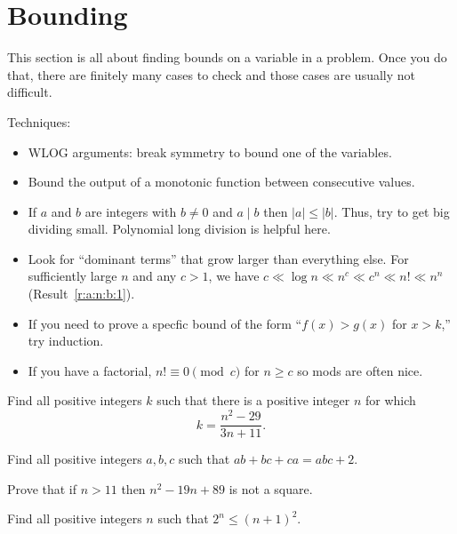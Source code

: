 \section{Bounding}
This section is all about finding bounds on a variable in a problem. Once you do
that, there are finitely many cases to check and those cases are usually not
difficult.

Techniques:
\begin{itemize}
  \item WLOG arguments: break symmetry to bound one of the variables.
  \item Bound the output of a monotonic function between consecutive values.
  \item If $a$ and $b$ are integers with $b\ne 0$ and $a\mid b$ then
    $|a|\le|b|$. Thus, try to get big dividing small. Polynomial long division
    is helpful here.
  \item Look for ``dominant terms'' that grow larger than everything else. For
    sufficiently large $n$ and any $c>1$, we have $c\ll\log n\ll n^c\ll c^n\ll
    n!\ll n^n$ (Result~\ref{r:a:n:b:1}).
  \item If you need to prove a specfic bound of the form ``$f(x)>g(x)$ for
    $x>k$,'' try induction.
  \item If you have a factorial, $n!\equiv 0\pmod c$ for $n\ge c$ so mods are
    often nice.
\end{itemize}
\begin{problem}{\label{p:n:n:b:1}}
   Find all positive integers $k$ such that there is a positive integer $n$
    for which
    \[k=\frac{n^2-29}{3n+11}.\]
\end{problem}
\begin{problem}{\label{p:n:n:b:2}}
  Find all positive integers $a,b,c$ such that $ab+bc+ca=abc+2$.
\end{problem}
\begin{problem}{\label{p:n:n:b:3}}
  Prove that if $n>11$ then $n^2-19n+89$ is not a square.
\end{problem}
\begin{problem}{\label{p:n:n:b:4}}
  Find all positive integers $n$ such that $2^n\le (n+1)^2$.
\end{problem}
